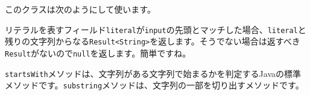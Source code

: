 \begin{Shaded}
\begin{Highlighting}[]
\NormalTok{\textgreater{} \{}
   
   \NormalTok{(}

\NormalTok{  \}}
   \NormalTok{\textless{}}\NormalTok{\textgreater{} }\NormalTok{(}
        \NormalTok{\textless{}}\NormalTok{()));}
\NormalTok{    \} }\NormalTok{ \{}
       \NormalTok{;}
\NormalTok{    \}}
\NormalTok{  \}}
\NormalTok{\}}
\end{Highlighting}
\end{Shaded}

このクラスは次のようにして使います。

\begin{Shaded}
\begin{Highlighting}[]
 \NormalTok{\textless{}}\NormalTok{\textgreater{}(}\NormalTok{, }\NormalTok{(} \NormalTok{(}\NormalTok{(}\NormalTok{));}
\end{Highlighting}
\end{Shaded}

リテラルを表すフィールド\texttt{literal}が\texttt{input}の先頭とマッチした場合、\texttt{literal}と残りの文字列からなる\texttt{Result\textless{}String\textgreater{}}を返します。そうでない場合は返すべき\texttt{Result}がないので\texttt{null}を返します。簡単ですね。

\texttt{startsWith}メソッドは、文字列がある文字列で始まるかを判定するJavaの標準メソッドです。\texttt{substring}メソッドは、文字列の一部を切り出すメソッドです。

